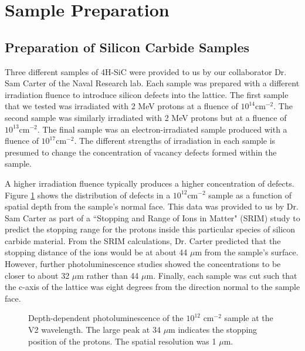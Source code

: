 \documentclass[oneside, astronomy, noacknowlegments]{BYUPhys}
\begin{document}
\section{Sample Preparation}

\subsection{Preparation of Silicon Carbide Samples}
\label{sec:SiCSamples}

Three different samples of 4H-SiC were provided to us by our collaborator Dr. Sam Carter of the Naval Research lab. Each sample was prepared with a different irradiation fluence to introduce silicon defects into the lattice. The first sample that we tested was irradiated with 2 MeV protons at a fluence of $10^{14} \text{cm}^{-2}$. The second sample was similarly irradiated with 2 MeV protons but at a fluence of $10^{13} \text{cm}^{-2}$. The final sample was an electron-irradiated sample produced with a fluence of $10^{17} \text{cm}^{-2}$. The different strengths of irradiation in each sample is presumed to change the concentration of vacancy defects formed within the sample.

A higher irradiation fluence typically produces a higher concentration of defects. Figure \ref{fig:SiCDepth} shows the distribution of defects in a $10^{12} \text{cm}^{-2}$ sample as a function of spatial depth from the sample's normal face. This data was provided to us by Dr. Sam Carter as part of a ``Stopping and Range of Ions in Matter" (SRIM) study to predict the stopping range for the protons inside this particular species of silicon carbide material. From the SRIM calculations, Dr. Carter predicted that the stopping distance of the ions would be at about 44 $\mu$m from the sample's surface. However, further photoluminescence studies showed the concentrations to be closer to about 32 $\mu$m rather than 44 $\mu$m. Finally, each sample was cut such that the c-axis of the lattice was eight degrees from the direction normal to the sample face.

\begin{figure}
    \caption[SiC Depth-Dependent Photoluminescence]{\label{fig:SiCDepth}
     Depth-dependent photoluminescence of the $10^{12}$ $\text{cm}^{−2}$ sample at the V2 wavelength. The large peak at 34 $\mu$m indicates the stopping position of the protons. The spatial resolution was 1 $\mu$m.}
 \end{figure}
\end{document}
